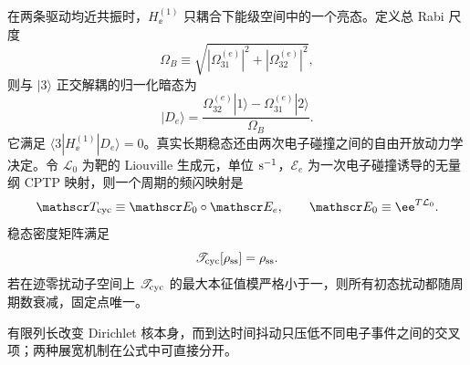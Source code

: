 在两条驱动均近共振时，$H_\ee^{(1)}$ 只耦合下能级空间中的一个亮态。定义总 Rabi 尺度
\begin{equation*}
\Omega_B
\equiv\sqrt{|\Omega_{31}^{(e)}|^2+|\Omega_{32}^{(e)}|^2},
\end{equation*}
则与 $|3\rangle$ 正交解耦的归一化暗态为
\begin{equation*}
|D_e\rangle
=\frac{\Omega_{32}^{(e)}|1\rangle
-\Omega_{31}^{(e)}|2\rangle}{\Omega_B}.
\end{equation*}
它满足 $\langle3|H_\ee^{(1)}|D_e\rangle=0$。真实长期稳态还由两次电子碰撞之间的自由开放动力学决定。令 $\mathcal L_0$ 为靶的 Liouville 生成元，单位 ${\rm s^{-1}}$，$\mathscr E_e$ 为一次电子碰撞诱导的无量纲 CPTP 映射，则一个周期的频闪映射是
\begin{equation*}
\mathscr T_{\rm cyc}
\equiv\mathscr E_0\circ\mathscr E_e,\qquad\mathscr E_0\equiv\ee^{T\mathcal L_0}.
\end{equation*}
稳态密度矩阵满足
\begin{equation*}
\mathscr T_{\rm cyc}[\rho_{\rm ss}]=\rho_{\rm ss}.
\end{equation*}
若在迹零扰动子空间上 $\mathscr T_{\rm cyc}$ 的最大本征值模严格小于一，则所有初态扰动都随周期数衰减，固定点唯一。

有限列长改变 Dirichlet 核本身，而到达时间抖动只压低不同电子事件之间的交叉项；两种展宽机制在公式中可直接分开。


